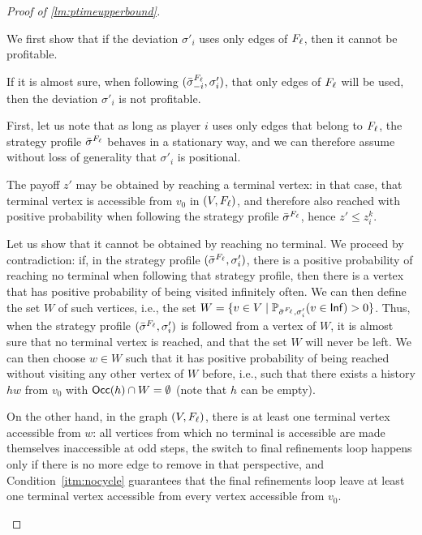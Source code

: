 \begin{proof}[Proof of \cref{lm:ptimeupperbound}]
\begin{claimproof}
        We first show that if the deviation $\sigma'_i$ uses only edges of $F_\ell$, then it cannot be profitable.

\begin{claim}\label{claim:finishingtouchescycleimpossible}
    If it is almost sure, when following $({\bar{\sigma}}^{F_\ell}_{-i}, \sigma'_i)$, that only edges of $F_\ell$ will be used, then the deviation $\sigma'_i$ is not profitable.
\end{claim}

\begin{claimproof}
    First, let us note that as long as player $i$ uses only edges that belong to $F_\ell$, the strategy profile ${\bar{\sigma}}^{F_\ell}$ behaves in a stationary way, and we can therefore assume without loss of generality that $\sigma'_i$ is positional.

    The payoff $z'$ may be obtained by reaching a terminal vertex: in that case, that terminal vertex is accessible from $v_0$ in $(V, F_\ell)$, and therefore also reached with positive probability when following the strategy profile ${\bar{\sigma}}^{F_\ell}$, hence $z' \leq z_i^k$.

    Let us show that it cannot be obtained by reaching no terminal.
    We proceed by contradiction: if, in the strategy profile $({\bar{\sigma}}^{F_\ell}, \sigma'_i)$, there is a positive probability of reaching no terminal when following that strategy profile, then there is a vertex that has positive probability of being visited infinitely often.
    We can then define the set $W$ of such vertices, i.e., the set $W = \{v \in V \mid \mathbb{P}_{{\bar{\sigma}}^{F_\ell}, \sigma'_i}(v \in \mathsf{Inf}) > 0\}$.
    Thus, when the strategy profile $({\bar{\sigma}}^{F_\ell}, \sigma'_i)$ is followed from a vertex of $W$, it is almost sure that no terminal vertex is reached, and that the set $W$ will never be left.
    We can then choose $w \in W$ such that it has positive probability of being reached without visiting any other vertex of $W$ before, i.e., such that there exists a history $hw$ from $v_0$ with $\mathsf{Occ}(h) \cap W = \emptyset$ (note that $h$ can be empty).
    
    On the other hand, in the graph $(V, F_\ell)$, there is at least one terminal vertex accessible from $w$: all vertices from which no terminal is accessible are made themselves inaccessible at odd steps, the switch to final refinements loop happens only if there is no more edge to remove in that perspective, and Condition~\ref{itm:nocycle} guarantees that the final refinements loop leave at least one terminal vertex accessible from every vertex accessible from $v_0$.


\end{claimproof}
\end{claimproof}
\end{proof}
